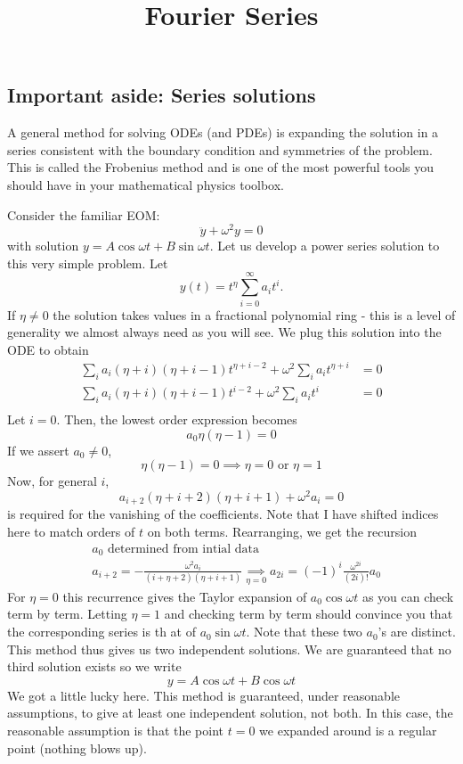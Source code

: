 \documentclass{article}
\title{Fourier Series}
\theoremstyle{definition}
\theoremstyle{remark}
\theoremstyle{remark}
\begin{document}
\maketitle

\subsection*{Important aside: Series solutions}
A general method for solving ODEs (and PDEs) is expanding the solution in a series consistent with the boundary condition and symmetries of the problem. This is called the Frobenius method and is one of the most powerful tools you should have in your mathematical physics toolbox. 

\begin{tcolorbox}[title=Frobenius' method for linear oscillator,breakable]
	Consider the familiar EOM:
	$$
	\ddot y +\omega^2 y = 0
	$$
	with solution $y = A \cos\omega t+B\sin\omega t$. Let us develop a power series solution to this very simple problem. Let
	$$
	y(t) = t^{\eta}\sum_{i=0}^\infty a_i t^{i}.
	$$
	If $\eta \neq 0$ the solution takes values in a fractional polynomial ring - this is a level of generality we almost always need as you will see. We plug this solution into the ODE to obtain
	\begin{align*}
		\sum_i a_i(\eta+i)(\eta+i-1)t^{\eta+i-2}+\omega^2\sum_i a_i t^{\eta+i}&=0\\
		\sum_i a_i(\eta+i)(\eta+i-1)t^{i-2}+\omega^2\sum_i a_i t^{i}&=0\\
	\end{align*}
	Let $i=0$. Then, the lowest order expression becomes
	$$
	a_0\eta(\eta-1)=0
	$$
	If we assert $a_0\neq 0$, 
	$$
	\eta(\eta-1)=0\implies \eta=0\text{ or } \eta=1
	$$
	Now, for general $i$,
	$$
	a_{i+2}(\eta+i+2)(\eta+i+1) +\omega^2 a_i = 0
	$$
	is required for the vanishing of the coefficients. Note that I have shifted indices here to match orders of $t$ on both terms. Rearranging, we get the recursion
	\begin{align*}
	 	&a_0 \text{ determined from intial data}\\
		&a_{i+2}=-\frac{\omega^2 a_i}{(i+\eta+2)(\eta+i+1)}	\underset{\eta=0}{\implies} a_{2i}=(-1)^i\frac{\omega^{2i}}{(2i)!}a_0
	 \end{align*} 
	 For $\eta=0$ this recurrence gives the Taylor expansion of $a_0\cos \omega t$ as you can check term by term. Letting $\eta=1$ and checking term by term should convince you that the corresponding series is th at of $a_0 \sin \omega t$. Note that these two $a_0$'s are distinct. This method thus gives us two independent solutions. We are guaranteed that no third solution exists so we write
	 $$
	 y = A\cos\omega t+B\cos \omega t
	 $$
	 We got a little lucky here. This method is guaranteed, under reasonable assumptions, to give at least one independent solution, not both. In this case, the reasonable assumption is that the point $t=0$ we expanded around is a regular point (nothing blows up).
	
\end{tcolorbox}
\end{document}
